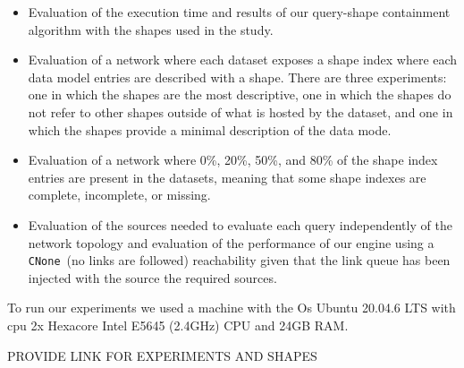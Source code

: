 \begin{itemize}
   \item Evaluation of the execution time and results of our query-shape containment algorithm with the shapes used in the study.
   \item Evaluation of a network where each dataset exposes a shape index where each data model entries are described with a shape. 
   There are three experiments: one in which the shapes are the most descriptive, one in which the shapes do not refer to other shapes outside of what is hosted by the dataset, and one in which the shapes provide a minimal description of the data mode.
   \item Evaluation of a network where 0\%, 20\%, 50\%, and 80\% of the shape index entries are present in the datasets, meaning that some shape indexes are complete, incomplete, or missing.
   \item Evaluation of the sources needed to evaluate each query independently of the network topology and evaluation of the performance of our engine using a \texttt{CNone}~\cite{Hartig2012}(no links are followed) reachability given that the link queue has been injected with the source the required sources.
 \end{itemize}

To run our experiments we used a machine with the Os Ubuntu 20.04.6 LTS with cpu 2x Hexacore Intel E5645 (2.4GHz) CPU and 24GB RAM.

PROVIDE LINK FOR EXPERIMENTS AND SHAPES
\iffalse
102x pcgen3 nodes
https://doc.ilabt.imec.be/ilabt/virtualwall/hardware.html#virtual-wall-2
\fi
